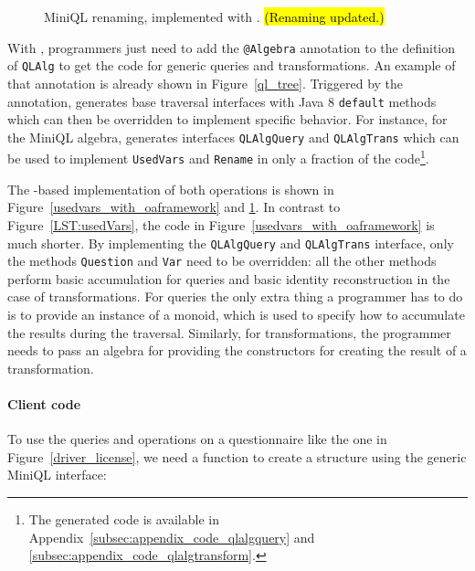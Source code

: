 \begin{figure}
\nocaptionrule
\caption{MiniQL renaming, implemented with  \Name. \hl{(Renaming updated.)}}
\label{rename_with_oaframework}
\end{figure}

With \Name, programmers just need to add the \lstinline{@Algebra} annotation
to the definition of \lstinline{QLAlg} to get the code for generic
queries and transformations. An example of that annotation is already
shown in Figure~\ref{ql_tree}.
Triggered by the annotation, \name generates base traversal interfaces with Java 8 \lstinline{default} methods which can then be overridden to implement specific behavior.
For instance, for the MiniQL algebra, \name generates interfaces
\lstinline{QLAlgQuery} and
\lstinline{QLAlgTrans} which can be used to implement \lstinline{UsedVars} and \lstinline{Rename} in only a fraction of the code\footnote{The generated code is available in Appendix~\ref{subsec:appendix_code_qlalgquery} and \ref{subsec:appendix_code_qlalgtransform}.}.

The \name-based implementation of both operations is shown in
Figure~\ref{usedvars_with_oaframework} and
\ref{rename_with_oaframework}. In contrast to Figure~\ref{LST:usedVars}, the
code in Figure~\ref{usedvars_with_oaframework} is much shorter.
By implementing the
\lstinline{QLAlgQuery} and \lstinline{QLAlgTrans} interface, only the
methods \lstinline{Question} and \lstinline{Var} need to be
overridden: all the other methods perform basic accumulation for
queries and basic identity reconstruction in the case of
transformations.  For queries the only extra thing a programmer
has to do is to provide an instance of a monoid, which is used to
specify how to accumulate the results during the traversal. Similarly,
for transformations, the programmer needs to pass an algebra for
providing the constructors for creating the result of a
transformation.

\paragraph{Client code}
To use the queries and operations on a questionnaire like the one in Figure~\ref{driver_license}, we need a function to create a structure using the generic MiniQL interface:



